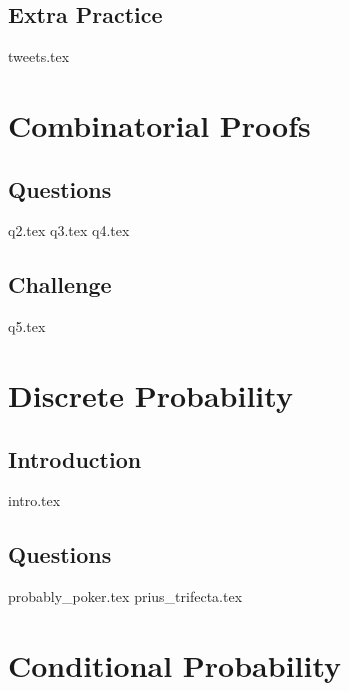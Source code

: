 \documentclass{exam}
\begin{document}
\subsection{Extra Practice}
\begin{questions}
{tweets.tex}
\end{questions}

\section{Combinatorial Proofs}
\subsection{Questions}
\begin{questions}
{q2.tex}
{q3.tex}
{q4.tex}
\end{questions}
\subsection{Challenge}
\begin{questions}
{q5.tex}
\end{questions}

\section{Discrete Probability}
\subsection{Introduction}
{intro.tex}
\subsection{Questions}
\begin{questions}
{probably_poker.tex}
{prius_trifecta.tex}
\end{questions}

\section{Conditional Probability}
\end{document}
